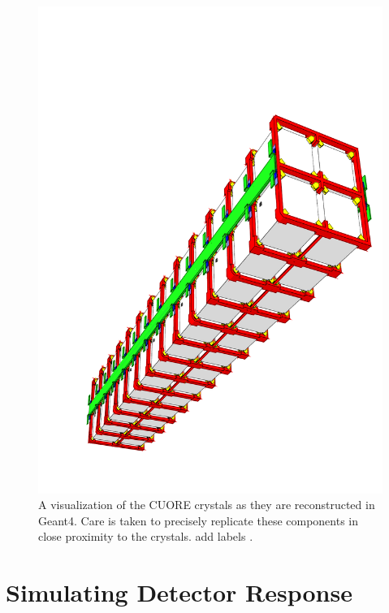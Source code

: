 \begin{figure}[htbp]
    \centering
    \includegraphics[height=0.4\paperheight, angle = 40, center = c]{Figures/Crystals.pdf}
    \caption[A visualization of the CUORE crystals as they are reconstructed in Geant4.]{A visualization of the CUORE crystals as they are reconstructed in Geant4. Care is taken to precisely replicate these components in close proximity to the crystals. \color{red} add labels \color{black}.}
    \label{fig:CUORE_crystals_MC}
\end{figure}

\section{Simulating Detector Response}